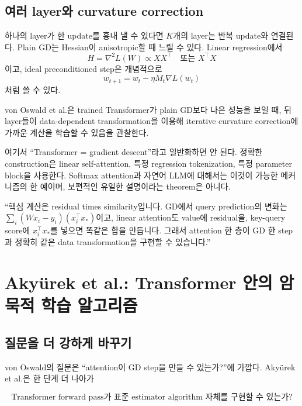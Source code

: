 \documentclass[11pt,a4paper,oneside,openany]{memoir}
\theoremstyle{definition}
\begin{document}
\section{여러 layer와 curvature correction}

하나의 layer가 한 update를 흉내 낼 수 있다면 $K$개의 layer는 반복 update와 연결된다.
Plain GD는 Hessian이 anisotropic할 때 느릴 수 있다. Linear regression에서
\[
H=\nabla^2L(W)\propto XX^\top\quad\text{또는 }X^\top X
\]
이고, ideal preconditioned step은 개념적으로
\[
w_{t+1}
=w_t-\eta M_t\nabla L(w_t)
\]
처럼 쓸 수 있다.

von Oswald et al.은 trained Transformer가 plain GD보다 나은 성능을 보일 때, 뒤 layer들이 data-dependent transformation을 이용해 iterative curvature correction에 가까운 계산을 학습할 수 있음을 관찰한다.

\begin{warningbox}
여기서 ``Transformer = gradient descent''라고 일반화하면 안 된다. 정확한 construction은 linear self-attention, 특정 regression tokenization, 특정 parameter block을 사용한다. Softmax attention과 자연어 LLM에 대해서는 이것이 가능한 메커니즘의 한 예이며, 보편적인 유일한 설명이라는 theorem은 아니다.
\end{warningbox}

\begin{presentbox}
``핵심 계산은 residual times similarity입니다. GD에서 query prediction의 변화는 $\sum_i(Wx_i-y_i)(x_i^\top x_*)$이고, linear attention도 value에 residual을, key-query score에 $x_i^\top x_*$를 넣으면 똑같은 합을 만듭니다. 그래서 attention 한 층이 GD 한 step과 정확히 같은 data transformation을 구현할 수 있습니다.''
\end{presentbox}

\chapter{Akyürek et al.: Transformer 안의 암묵적 학습 알고리즘}

\section{질문을 더 강하게 바꾸기}

von Oswald의 질문은 ``attention이 GD step을 만들 수 있는가?''에 가깝다.
Akyürek et al.은 한 단계 더 나아가

\[
\text{Transformer forward pass가 표준 estimator algorithm 자체를 구현할 수 있는가?}
\]
\end{document}
